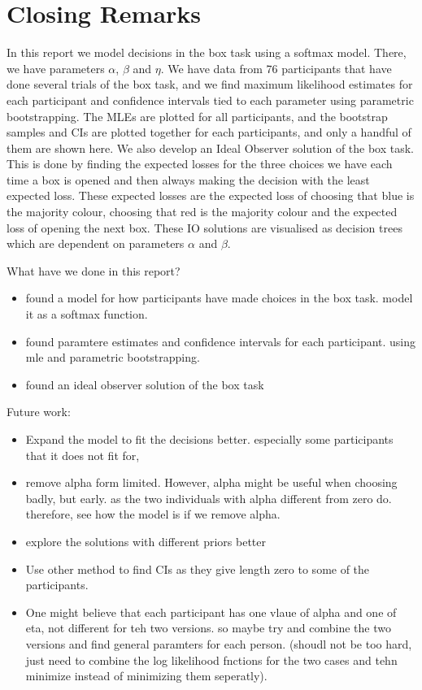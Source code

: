 \chapter{Closing Remarks}
In this report we model decisions in the box task using a softmax model. There, we have parameters $\alpha$, $\beta$ and $\eta$. We have data from 76 participants that have done several trials of the box task, and we find maximum likelihood estimates for each participant and confidence intervals tied to each parameter using parametric bootstrapping. The MLEs are plotted for all participants, and the bootstrap samples and CIs are plotted together for each participants, and only a handful of them are shown here. 
We also develop an Ideal Observer solution of the box task. This is done by finding the expected losses for the three choices we have each time a box is opened and then always making the decision with the least expected loss. These expected losses are the expected loss of choosing that blue is the majority colour, choosing that red is the majority colour and the expected loss of opening the next box. These IO solutions are visualised as decision trees which are dependent on parameters $\alpha$ and $\beta$.



What have we done in this report? 
\begin{itemize}
    \item found a model for how participants have made choices in the box task. model it as a softmax function. 
    \item found paramtere estimates and confidence intervals for each participant. using mle and parametric bootstrapping.
    \item found an ideal observer solution of the box task
\end{itemize}




Future work:
\begin{itemize}
    \item Expand the model to fit the decisions better. especially some participants that it does not fit for,
    \item remove alpha form limited. However, alpha might be useful when choosing badly, but early. as the two individuals with alpha different from zero do. therefore, see how the model is if we remove alpha. 
    \item explore the solutions with different priors better
    \item Use other method to find CIs as they give length zero to some of the participants. 
    \item One might believe that each participant has one vlaue of alpha and one of eta, not different for teh two versions. so maybe try and combine the two versions and find general paramters for each person. (shoudl not be too hard, just need to combine the log likelihood fnctions for the two cases and tehn minimize instead of minimizing them seperatly).
\end{itemize}

